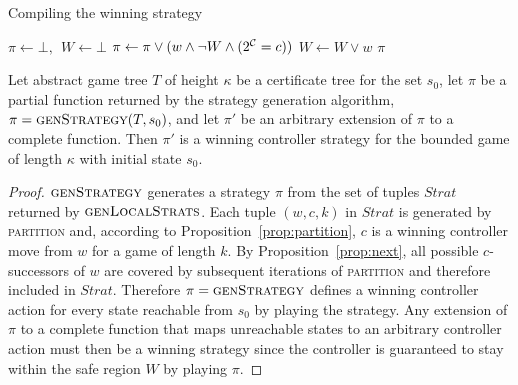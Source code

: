 
\begin{algorithm}[t]
   \caption{Compiling the  winning strategy}\label{alg:compile}
   \begin{algorithmic}[1]
            \State $\pi \gets \bot,~~W \gets \bot$
            \State $\pi \gets \pi \lor (w \land \neg W \land (2^{\mathcal{C}}=c))$
                \State $W \gets W \lor w$
            \EndFor
            \State \Return $\pi$
        \EndFunction
    \end{algorithmic}
\end{algorithm}



\begin{theorem}
Let abstract game tree $T$ of height $\kappa$ be a certificate tree for the set $s_0$, let $\pi$ be a partial function returned by the strategy generation algorithm, $\pi=\textsc{genStrategy}(T,s_0)$, and let $\pi'$ be an arbitrary extension of $\pi$ to a complete function.  Then $\pi'$ is a winning controller strategy for the bounded game of length $\kappa$ with initial state $s_0$.
\end{theorem}
\begin{proof}
    $\textsc{genStrategy}$ generates a strategy $\pi$ from the set of tuples $Strat$ returned by $\textsc{genLocalStrats}$. Each tuple $(w, c, k)$ in $Strat$ is generated by \textsc{partition} and, according to Proposition~\ref{prop:partition}, $c$ is a winning controller move from $w$ for a game of length $k$. By Proposition~\ref{prop:next}, all possible $c$-successors of $w$ are covered by subsequent iterations of \textsc{partition} and therefore included in $Strat$. Therefore $\pi = \textsc{genStrategy}$ defines a winning controller action for every state reachable from $s_0$ by playing the strategy. Any extension of $\pi$ to a complete function that maps unreachable states to an arbitrary controller action must then be a winning strategy since the controller is guaranteed to stay within the safe region $W$ by playing $\pi$.
\end{proof}

